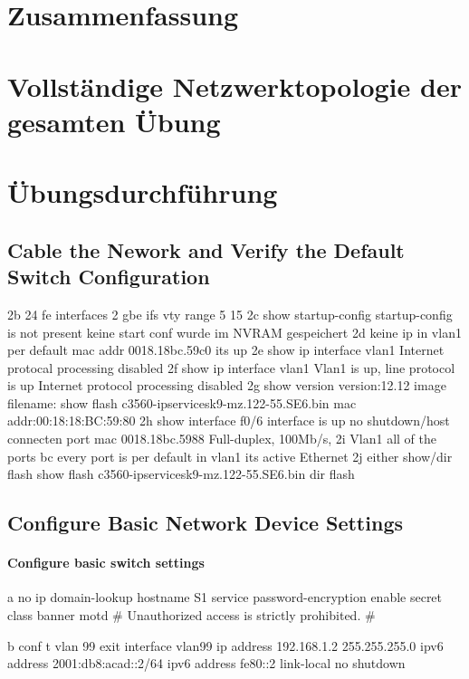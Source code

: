 \documentclass[a4paper]{article}
\begin{document}
\section{Zusammenfassung}

\newpage

\section{Vollständige Netzwerktopologie der gesamten Übung}

\newpage

\section{Übungsdurchführung}
\subsection{Cable the Nework and Verify the Default Switch Configuration}
2b
	24 fe interfaces
		2 gbe ifs
		vty range
			5 15
2c 
	show startup-config
	startup-config is not present
	keine start conf wurde im NVRAM gespeichert
2d 
	keine ip in vlan1 per default
	mac addr
	0018.18bc.59c0
	its up
2e	
	show ip interface vlan1
	Internet protocal processing disabled
2f
	show ip interface vlan1
	Vlan1 is up, line protocol is up
	Internet protocol processing disabled
2g
	show version
	version:12.12
	image filename:
	show flash
	c3560-ipservicesk9-mz.122-55.SE6.bin
	mac addr:00:18:18:BC:59:80
2h
	show interface f0/6
	interface is up
	no shutdown/host connecten
	port mac 0018.18bc.5988
	Full-duplex, 100Mb/s,
2i
	Vlan1
	all of the ports bc every port is per default in vlan1
	its active
	Ethernet
2j 
	either show/dir flash
	show flash
		c3560-ipservicesk9-mz.122-55.SE6.bin
	dir flash

\subsection{Configure Basic Network Device Settings}
\paragraph {Configure basic switch settings}

a
no ip domain-lookup
hostname S1
service password-encryption
enable secret class
banner motd #
Unauthorized access is strictly prohibited. #

b
conf t
vlan 99 
exit
interface vlan99
ip address 192.168.1.2 255.255.255.0
ipv6 address 2001:db8:acad::2/64
ipv6 address fe80::2 link-local
no shutdown
\end{document}
